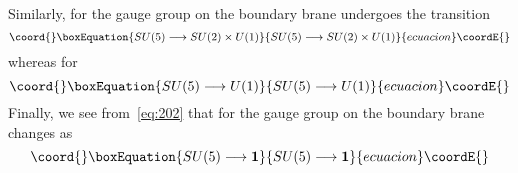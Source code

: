 \documentclass[a4paper,12pt]{article}
\numberwithin{equation}{section}
\theoremstyle{plain}
\begin{document}
Similarly, for \coordHE{} the gauge group on the boundary brane
undergoes the transition
\begin{equation}\coord{}\boxEquation{
SU(5) \longrightarrow SU(2)\times U(1)
\label{eq:205}
}{
SU(5) \longrightarrow SU(2)\times U(1)
}{ecuacion}\coordE{}\end{equation}
whereas for \coordHE{}
\begin{equation}\coord{}\boxEquation{
SU(5) \longrightarrow U(1) 
\label{eq:206}
}{
SU(5) \longrightarrow U(1) 
}{ecuacion}\coordE{}\end{equation}
Finally, we see from~\eqref{eq:202} that for \coordHE{} the gauge
group on the boundary brane changes as
\begin{equation}\coord{}\boxEquation{
SU(5) \longrightarrow {\bf 1 \rm}
\label{eq:206A}
}{
SU(5) \longrightarrow {\bf 1 \rm}
}{ecuacion}\coordE{}\end{equation}

\smallskip

\
\end{document}
